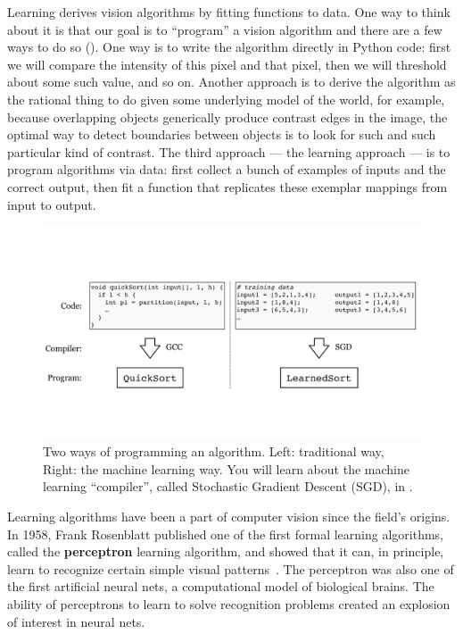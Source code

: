 Learning derives vision algorithms by fitting functions to data. One way to think about it is that our goal is to ``program'' a vision algorithm and there are a few ways to do so (\fig{\ref{fig:taxonomy:programming_vs_learning}}). One way is to write the algorithm directly in Python code: first we will compare the intensity of this pixel and that pixel, then we will threshold about some such value, and so on. Another approach is to derive the algorithm as the rational thing to do given some underlying model of the world, for example, because overlapping objects generically produce contrast edges in the image, the optimal way to detect boundaries between objects is to look for such and such particular kind of contrast. The third approach --- the learning approach --- is to program algorithms via data: first collect a bunch of examples of inputs and the correct output, then fit a function that replicates these exemplar mappings from input to output.


\begin{figure}[t]
\centerline{
\includegraphics[width=1\linewidth]{figures/taxonomy/programming_vs_learning.pdf}
} 
\caption{Two ways of programming an algorithm. Left: traditional way, Right: the machine learning way. You will learn about the machine learning ``compiler'', called Stochastic Gradient Descent (SGD), in \chap{\ref{chapter:backpropagation}}.} 
\label{fig:taxonomy:programming_vs_learning}
\end{figure}


Learning algorithms have been a part of computer vision since the field's origins. In 1958, Frank Rosenblatt published one of the first formal learning algorithms, called the {\bf perceptron}
learning algorithm, and showed that it can, in principle, learn to recognize certain simple visual patterns~\cite{rosenblatt1958perceptron}. 
The perceptron was also one of the first artificial neural nets, a computational model of biological brains. The ability of perceptrons to learn to solve recognition problems created an explosion of interest in neural nets. 

